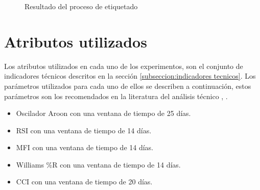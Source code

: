 \documentclass[12pt]{scrbook}
\theoremstyle{break}
\theoremstyle{break}
\begin{document}
\begin{figure}[ht]
\centering
{}
\caption{\label{imagen:etiquetado} Resultado del proceso de etiquetado}
\end{figure}

\section{Atributos utilizados}
\label{seccion:atributos}
Los atributos utilizados en cada uno de los experimentos, son el conjunto de indicadores técnicos descritos en la sección \ref{subseccion:indicadores tecnicos}. Los parámetros utilizados para cada uno de ellos se describen a continuación, estos parámetros son los recomendados en la literatura del análisis técnico \cite{encycoplediaTechnicalIndicators}, \cite{technicalAnalysisKirkPatrick}.


\begin{itemize}
\item Oscilador Aroon con una ventana de tiempo de 25 días.

\item RSI con una ventana de tiempo de 14 días.

\item MFI con una ventana de tiempo de 14 días.

\item Williams \%R con una ventana de tiempo de 14 días.

\item CCI con una ventana de tiempo de 20 días.
\end{itemize}
\end{document}
